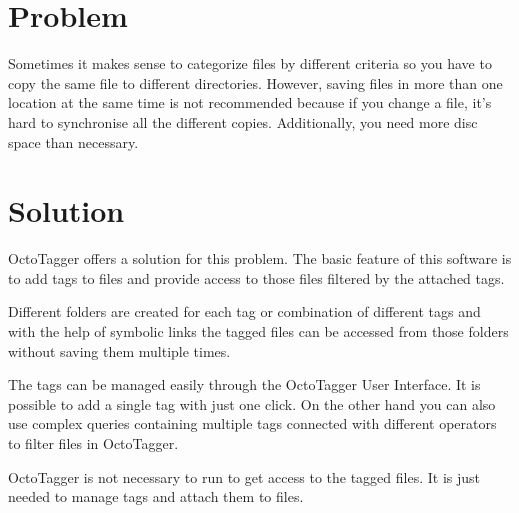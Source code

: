 \section{Problem}
\def\kapitelautor{Julian Lorenz}

Sometimes it makes sense to categorize files by different criteria so you have to copy the same file to different directories. However, saving files in more than one location at the same time is not recommended because if you change a file, it's hard to synchronise all the different copies.  Additionally, you need more disc space than necessary.

\section{Solution}
\def\kapitelautor{Julian Lorenz}

OctoTagger offers a solution for this problem. The basic feature of this software is to add tags to files and provide access to those files filtered by the attached tags. 

Different folders are created for each tag or combination of different tags and with the help of symbolic links the tagged files can be accessed from those folders without saving them multiple times.

The tags can be managed easily through the OctoTagger User Interface. It is possible to add a single tag with just one click. On the other hand you can also use complex queries containing multiple tags connected with different operators to filter files in OctoTagger. 

OctoTagger is not necessary to run to get access to the tagged files. It is just needed to manage tags and attach them to files.


